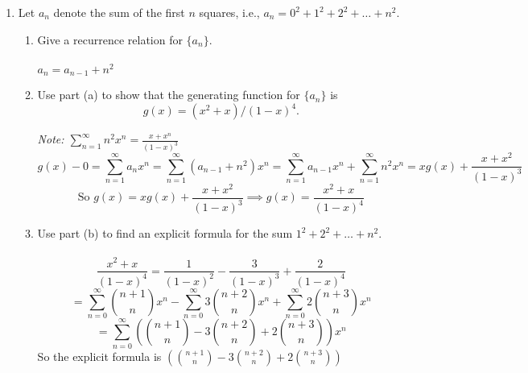 \documentclass[12pt]{article}
\begin{document}
\begin{enumerate}
\item Let $a_n$ denote the sum of the first $n$ squares, i.e., $a_n = 0^2 +  1^2 + 2^2 + \ldots + n^2$.

\begin{enumerate}

\item Give a recurrence relation for $\{a_n\}$. \\\\
$a_n=a_{n-1}+n^2$\\
\item Use part (a) to show that the generating function for $\{a_n\}$ is \[g(x) = (x^2+x)/(1-x)^4.\]

{\em Note: $\sum_{n=1}^\infty n^2 x^n = \frac{x+x^n}{(1-x)^3}$}\\
\[g(x)-0=\sum_{n=1}^{\infty}a_nx^n = \sum_{n=1}^{\infty}(a_{n-1}+n^2)x^n = \sum_{n=1}^{\infty}a_{n-1}x^n+ \sum_{n=1}^{\infty}n^2x^n  = xg(x)+\frac{x+x^2}{(1-x)^3}\]
\[\text{So } g(x) = xg(x) + \frac{x+x^2}{(1-x)^3} \implies g(x)=\frac{x^2+x}{(1-x)^4}\]

\item Use part (b) to find an explicit formula for the sum $1^2 + 2^2 + \ldots + n^2$. \\\\

\[\frac{x^2+x}{(1-x)^4}=\frac{1}{(1-x)^2}-\frac{3}{(1-x)^3}+\frac{2}{(1-x)^4}\]
\[= \sum_{n=0}^{\infty}\binom{n+1}{n}x^n-\sum_{n=0}^{\infty}3\binom{n+2}{n}x^n+\sum_{n=0}^{\infty}2\binom{n+3}{n}x^n\]
\[= \sum_{n=0}^{\infty}\left(\binom{n+1}{n}-3\binom{n+2}{n}+2\binom{n+3}{n}\right)x^n\]
So the explicit formula is $\left(\binom{n+1}{n}-3\binom{n+2}{n}+2\binom{n+3}{n}\right)$
\end{enumerate}

\end{enumerate}
\end{document}

